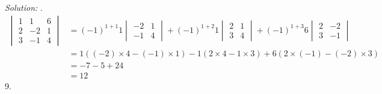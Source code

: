 \documentclass[11pt]{homework}
\begin{document}
\emph{Solution:}
.
\begin{align*}
  \begin{vmatrix}
  1 & 1 & 6 \\
  2 & -2& 1 \\
  3 & -1& 4
  \end{vmatrix}
  &= 
  (-1)^{1+1}
  1
  \begin{vmatrix}
    -2 & 1 \\
    -1 & 4
  \end{vmatrix}
  + (-1)^{1+2}
  1
  \begin{vmatrix}
    2 & 1 \\
    3 & 4
  \end{vmatrix}
  + (-1)^{1+3}
  6
  \begin{vmatrix}
    2 & -2 \\
    3 & -1
  \end{vmatrix} \\
  &= 
    1 ( (-2) \times 4 - (-1) \times 1)
  - 1 ( 2 \times 4 - 1 \times 3)
  + 6 ( 2 \times (-1) - (-2) \times 3)\\
  &= -7 -5 + 24 \\
  &= 12
\end{align*}
9.
\end{document}
